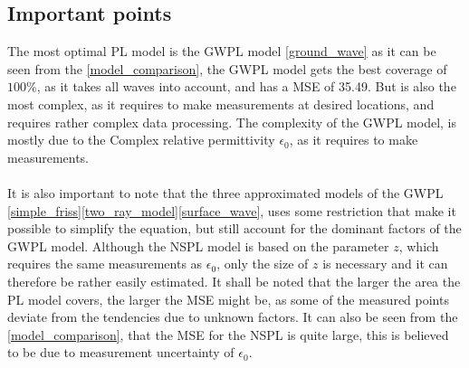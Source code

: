 \subsection*{Important points}
The most optimal PL model is the GWPL model \eqref{ground_wave} as it can be seen from the  \autoref{model_comparison}, the GWPL model gets the best coverage of $100\%$, as it takes all waves into account, and has a MSE of 35.49. But is also the most complex, as it requires to make measurements at desired locations, and requires rather complex data processing. The complexity of the GWPL model, is mostly due to the Complex relative permittivity $\epsilon_{0}$, as it requires to make measurements. 
\\
\\
It is also important to note that the three approximated models of the GWPL \eqref{simple_friss}\eqref{two_ray_model}\eqref{surface_wave}, uses some restriction that make it possible to simplify the equation, but still account for the dominant factors of the GWPL model. Although the NSPL model is based on the parameter $z$, which requires the same measurements as $\epsilon_{0}$, only the size of $z$ is necessary and it can therefore be rather easily estimated. It shall be noted that the larger the area the PL model covers, the larger the MSE might be, as some of the measured points deviate from the tendencies due to unknown factors. It can also be seen from the \autoref{model_comparison}, that the MSE for the NSPL is quite large, this is believed to be due to measurement uncertainty of $\epsilon_{0}$.  



